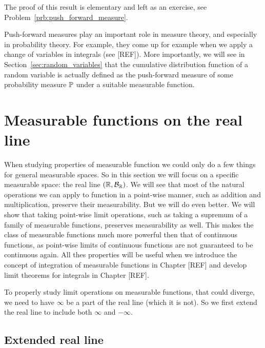 The proof of this result is elementary and left as an exercise, see Problem~\ref{prb:push_forward_measure}. 

Push-forward measures play an important role in measure theory, and especially in probability theory. For example, they come up for example when we apply a change of variables in integrals (see [REF]). More importantly, we will see in Section~\ref{sec:random_variables} that the cumulative distribution function of a random variable is actually defined as the push-forward measure of some probability measure $\mathbb P$ under a suitable measurable function.

\section{Measurable functions on the real line}\label{sec:measurable_functions_real_line}

When studying properties of measurable function we could only do a few things for general measurable spaces. So in this section we will focus on a specific measurable space: the real line $(\mathbb R, \mathcal B_{\mathbb R})$. We will see that most of the natural operations we can apply to function in a point-wise manner, such as addition and multiplication, preserve their measurability. But we will do even better. We will show that taking point-wise limit operations, such as taking a supremum of a family of measurable functions, preserves measurability as well. This makes the class of measurable functions much more powerful then that of continuous functions, as point-wise limits of continuous functions are not guaranteed to be continuous again. All thes properties will be useful when we introduce the concept of integration of measurable functions in Chapter [REF] and develop limit theorems for integrals in Chapter [REF].

To properly study limit operations on measurable functions, that could diverge, we need to have $\infty$ be a part of the real line (which it is not). So we first extend the real line to include both $\infty$ and $-\infty$.

\subsection{Extended real line}

